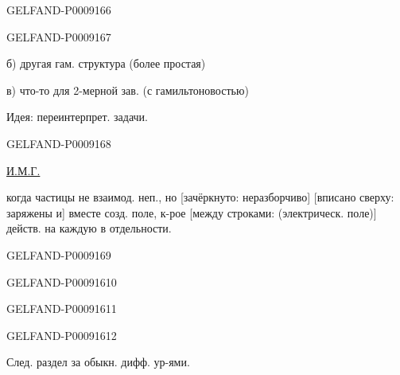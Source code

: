 \begin{GelfandAdjacentEvidence}{GELFAND-P000916}{6}

\end{GelfandAdjacentEvidence}
\begin{GelfandAdjacentEvidence}{GELFAND-P000916}{7}


б) другая гам. структура (более простая)

в) что-то для 2-мерной зав. (с гамильтоновостью)

Идея: переинтерпрет. задачи.
\end{GelfandAdjacentEvidence}
\begin{GelfandAdjacentEvidence}{GELFAND-P000916}{8}


\uline{И.М.Г.}\quad {}

когда частицы не взаимод. неп., но
[зачёркнуто: неразборчиво]
[вписано сверху: заряжены и] вместе созд. поле, к-рое
[между строками: (электрическ. поле)]
действ. на каждую в отдельности.

\end{GelfandAdjacentEvidence}
\begin{GelfandAdjacentEvidence}{GELFAND-P000916}{9}

\end{GelfandAdjacentEvidence}
\begin{GelfandAdjacentEvidence}{GELFAND-P000916}{10}

\end{GelfandAdjacentEvidence}
\begin{GelfandAdjacentEvidence}{GELFAND-P000916}{11}

\end{GelfandAdjacentEvidence}
\begin{GelfandAdjacentEvidence}{GELFAND-P000916}{12}


След. раздел за обыкн. дифф. ур-ями.
\end{GelfandAdjacentEvidence}



